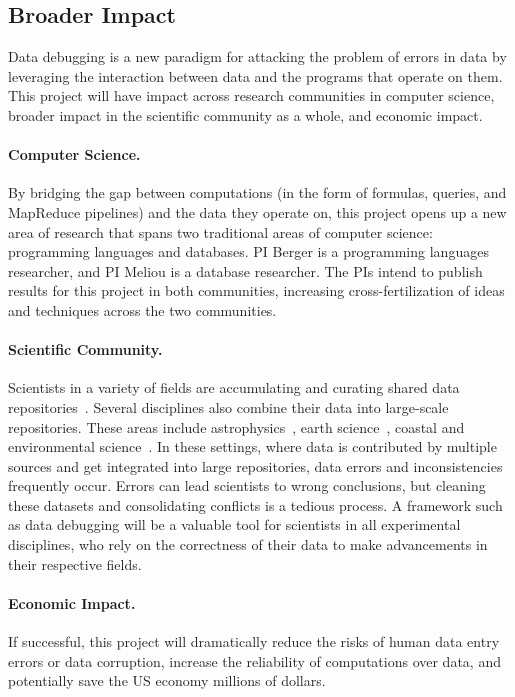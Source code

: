 \subsection{Broader Impact} 

Data debugging is a new paradigm for attacking the problem of errors
in data by leveraging the interaction between data and the programs
that operate on them. This project will have impact across research
communities in computer science, broader impact in the scientific
community as a whole, and economic impact.

\paragraph{Computer Science.}
By bridging the gap between computations (in the form of formulas,
queries, and MapReduce pipelines) and the data they operate on, this
project opens up a new area of research that spans two traditional
areas of computer science: programming languages and databases. PI
Berger is a programming languages researcher, and PI Meliou is a
database researcher. The PIs intend to publish results for this
project in both communities, increasing cross-fertilization of ideas
and techniques across the two communities.

\paragraph{Scientific Community.} %
\label{par:scientific}
Scientists in a variety of fields are accumulating and curating shared
data repositories~\cite{uniprot,naturemap}. Several disciplines also
combine their data into large-scale repositories. These areas include
astrophysics~\cite{skysurvey}, earth science~\cite{iris,unavco},
coastal and environmental science~\cite{wagda}. In these settings,
where data is contributed by multiple sources and get integrated into
large repositories, data errors and inconsistencies frequently
occur. Errors can lead scientists to wrong conclusions, but cleaning
these datasets and consolidating conflicts is a tedious process. A
framework such as data debugging will be a valuable tool for
scientists in all experimental disciplines, who rely on the
correctness of their data to make advancements in their respective
fields.

\paragraph{Economic Impact.}
If successful, this project will dramatically reduce the risks of
human data entry errors or data corruption, increase the reliability
of computations over data, and potentially save the US economy
millions of dollars.

